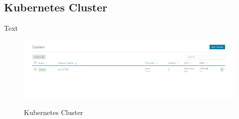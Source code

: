 \subsection{Kubernetes Cluster}

Text 

\begin{figure}[H]
\centering
\caption {Kubernetes Cluster}
\includegraphics[width=\linewidth]{images/cluster-overview.png}
\label{fig:clusterOverview}
\end{figure}

